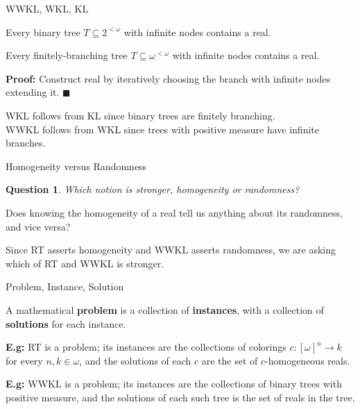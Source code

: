 \begin{frame}{WWKL, WKL, KL}
  \begin{thm*}
    Every binary tree $T\subseteq2^{<\omega}$ with infinite nodes contains
    a real.
  \end{thm*}

  \begin{thm*}
    Every finitely-branching tree $T\subseteq\omega^{<\omega}$ with
    infinite nodes contains a real.
  \end{thm*}
  \textbf{Proof:} Construct real by iteratively choosing the branch with
  infinite nodes extending it. $\blacksquare$

  \vspace{2em}
  WKL follows from KL since binary trees are finitely branching.\\
  \vspace{1em}
  WWKL follows from WKL since trees with positive measure have infinite
  branches.
\end{frame}

\begin{frame}{Homogeneity versus Randomness}
  \newtheorem*{question*}{Question}
  \begin{question*}
    Which notion is stronger, homogeneity or randomness?
  \end{question*}

  \vspace{2em}
  Does knowing the homogeneity of a real tell us anything about its
  randomness, and vice versa?

  \vspace{2em}
  Since RT asserts homogeneity and WWKL asserts randomness, we are asking
  which of RT and WWKL is stronger.
\end{frame}

\begin{frame}{Problem, Instance, Solution}
  \begin{define*}
    A mathematical \textbf{problem} is a collection of \textbf{instances},
    with a collection of \textbf{solutions} for each instance.
  \end{define*}

  \vspace{2em}
  \textbf{E.g:} RT is a problem; its instances are the collections of
  colorings $c:[\omega]^n\rightarrow k$ for every $n,k\in\omega$, and the
  solutions of each $c$ are the set of $c$-homogeneous reals.

  \vspace{2em}
  \textbf{E.g:} WWKL is a problem; its instances are the collections of
  binary trees with positive measure, and the solutions of each such tree
  is the set of reals in the tree.
\end{frame}

